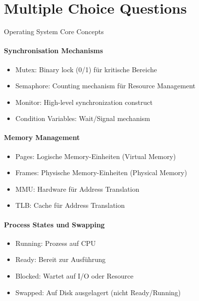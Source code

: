 \section{Multiple Choice Questions}

\begin{KR}{Operating System Core Concepts}
    \paragraph{Synchronisation Mechanisms}
    \begin{itemize}
        \item Mutex: Binary lock (0/1) für kritische Bereiche
        \item Semaphore: Counting mechanism für Resource Management
        \item Monitor: High-level synchronization construct
        \item Condition Variables: Wait/Signal mechanism
    \end{itemize}
    
    \paragraph{Memory Management}
    \begin{itemize}
        \item Pages: Logische Memory-Einheiten (Virtual Memory)
        \item Frames: Physische Memory-Einheiten (Physical Memory)  
        \item MMU: Hardware für Address Translation
        \item TLB: Cache für Address Translation
    \end{itemize}
    
    \paragraph{Process States und Swapping}
    \begin{itemize}
        \item Running: Prozess auf CPU
        \item Ready: Bereit zur Ausführung
        \item Blocked: Wartet auf I/O oder Resource
        \item Swapped: Auf Disk ausgelagert (nicht Ready/Running)
    \end{itemize}
    

\end{KR}
